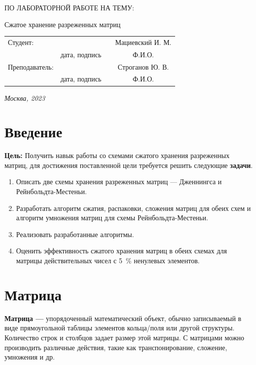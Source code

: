 \documentclass[12pt, a4paper]{article}
\begin{document}
\begin{titlepage}
\begin{center}
\begin{bf}
    \fontsize{20}{30}\selectfont
    ПО ЛАБОРАТОРНОЙ РАБОТЕ НА ТЕМУ:

    Сжатое хранение разреженных матриц

   \end{bf}
  \end{center}

  \fontsize{14}{21}\selectfont
  \vspace{5cm}


  \noindent\begin{tabularx}{\textwidth}{ X >{\centering}p{4cm} p{1cm} c }
   Студент: & & & Мациевский И. М. \\ \cline{2-2} \cline{4-4}
   & \fontsize{10}{15}\selectfont дата, подпись & & \fontsize{10}{15}\selectfont Ф.И.О. \\
   Преподаватель: & & & Строганов Ю. В.\\ \cline{2-2} \cline{4-4}
   & \fontsize{10}{15}\selectfont дата, подпись & & \fontsize{10}{15}\selectfont Ф.И.О.
   \end{tabularx}

  \vspace{\fill}

  \begin{center}
   \it{Москва}, 2023
  \end{center}

  \thispagestyle{empty}
\end{titlepage}\newpage
\tableofcontents
\newpage
\section{Введение}
\justifying
\textbf{Цель:}
Получить навык работы со схемами сжатого хранения 
разреженных матриц, для достижения поставленной цели требуется решить 
следующие \textbf{задачи}.
\begin{enumerate}
	\item Описать две схемы хранения разреженных матриц 
	--- Дженнингса и\\
	Рейнбольдта-Местеньи.
	\item Разработать алгоритм сжатия, распаковки, 
	сложения матриц для обеих схем и алгоритм умножения
	матриц для схемы Рейнбольдта-Местеньи.
	\item Реализовать разработанные алгоритмы.
	\item Оценить эффективность сжатого хранения матриц 
	в обеих схемах для матрицы действительных чисел с 5~\% ненулевых элементов.
\end{enumerate}
\section{Матрица}
\textbf{Матрица ---} упорядоченный математический объект, 
обычно записываемый в виде прямоугольной таблицы 
элементов кольца/поля или другой структуры. Количество 
строк и столбцов задает размер этой матрицы. С матрицами 
можно производить различные действия, такие как 
транспонирование, сложение, умножения и др. 
\end{document}
